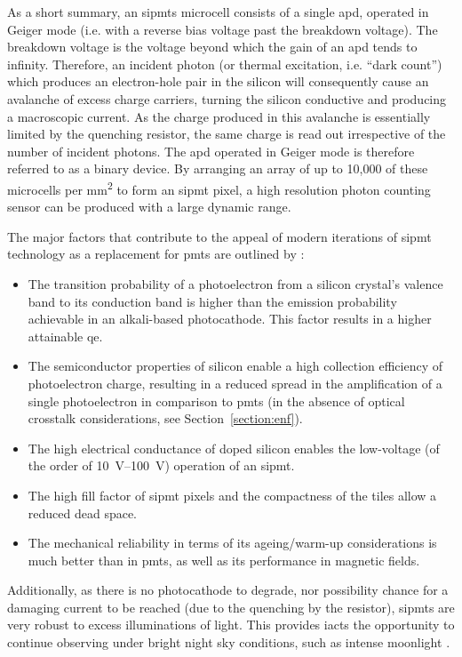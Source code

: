 As a short summary, an \glspl{sipmt} microcell consists of a single \gls{apd}, operated in Geiger mode (i.e. with a reverse bias voltage past the breakdown voltage). The breakdown voltage is the voltage beyond which the gain of an \gls{apd} tends to infinity. Therefore, an incident photon (or thermal excitation, i.e. ``dark count'') which produces an electron-hole pair in the silicon will consequently cause an avalanche of excess charge carriers, turning the silicon conductive and producing a macroscopic current. As the charge produced in this avalanche is essentially limited by the quenching resistor, the same charge is read out irrespective of the number of incident photons. The \gls{apd} operated in Geiger mode is therefore referred to as a binary device. By arranging an array of up to 10,000 of these microcells per \si{mm\squared} to form an \gls{sipmt} pixel, a high resolution photon counting sensor can be produced with a large dynamic range.

The major factors that contribute to the appeal of modern iterations of \gls{sipmt} technology as a replacement for \glspl{pmt} are outlined by \textcite{Ghassemi2017}:
\begin{itemize}
\item The transition probability of a photoelectron from a silicon crystal’s valence band to its conduction band is higher than the emission probability achievable in an alkali-based photocathode. This factor results in a higher attainable \gls{qe}. 
\item The semiconductor properties of silicon enable a high collection efficiency of photoelectron charge, resulting in a reduced spread in the amplification of a single photoelectron in comparison to \glspl{pmt} (in the absence of optical crosstalk considerations, see Section~\ref{section:enf}).
\item The high electrical conductance of doped silicon enables the low-voltage (of the order of \SIrange{10}{100}{V}) operation of an \gls{sipmt}.
\item The high fill factor of \gls{sipmt} pixels and the compactness of the tiles allow a reduced dead space.
\item The mechanical reliability in terms of its ageing/warm-up considerations is much better than in \glspl{pmt}, as well as its performance in magnetic fields.
\end{itemize}

Additionally, as there is no photocathode to degrade, nor possibility chance for a damaging current to be reached (due to the quenching by the resistor), \glspl{sipmt} are very robust to excess illuminations of light. This provides \glspl{iact} the opportunity to continue observing under bright night sky conditions, such as intense moonlight \cite{Knoetig2013,Heller2017}.


